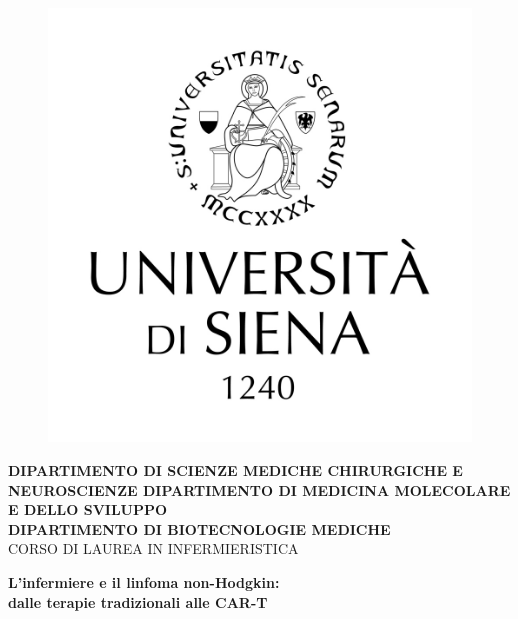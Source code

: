 \begin{titlepage}
\begin{figure}[!htb]
    \centering
    \includegraphics[keepaspectratio=true,scale=0.8]{format/img/LOGO_UNISI_VERTICALE_NERO_medio.jpg}
\end{figure}

\begin{center}
    \large{\bf DIPARTIMENTO DI SCIENZE MEDICHE CHIRURGICHE E NEUROSCIENZE
    DIPARTIMENTO DI MEDICINA MOLECOLARE E DELLO SVILUPPO\\
    DIPARTIMENTO DI BIOTECNOLOGIE MEDICHE}
    \vspace{0.5mm}
    \\ \large{CORSO DI LAUREA IN INFERMIERISTICA}
\end{center}

\vspace{15mm}
\begin{center}
    {\LARGE{\bf L'infermiere e il linfoma non-Hodgkin:\\ \vspace{5mm} dalle terapie tradizionali alle CAR-T }}
    
    
\end{center}
\vspace{20mm}


\end{titlepage}
